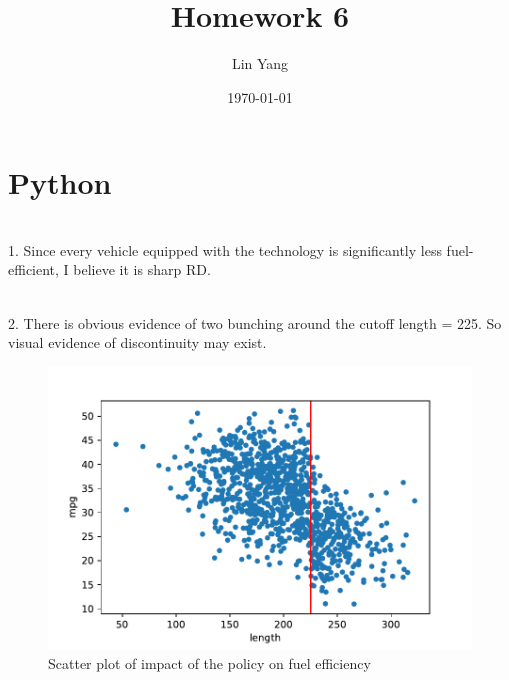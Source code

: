 \documentclass{article}
\title{Homework 6}
\author{Lin Yang}
\date{\today}
\begin{document}
\maketitle  
\section{Python}
~\\
1. Since every vehicle equipped with the technology is significantly less fuel-efficient, I believe it is sharp RD. 

~\\
2. There is obvious evidence of two bunching around the cutoff length = 225. So visual evidence of discontinuity may exist. 

\begin{figure}[ht]
\centering
 \includegraphics[scale = 0.9]{q2.pdf}
 \caption{Scatter plot of impact of the policy on fuel efficiency}
 
 \end{figure}
 
\end{document}

